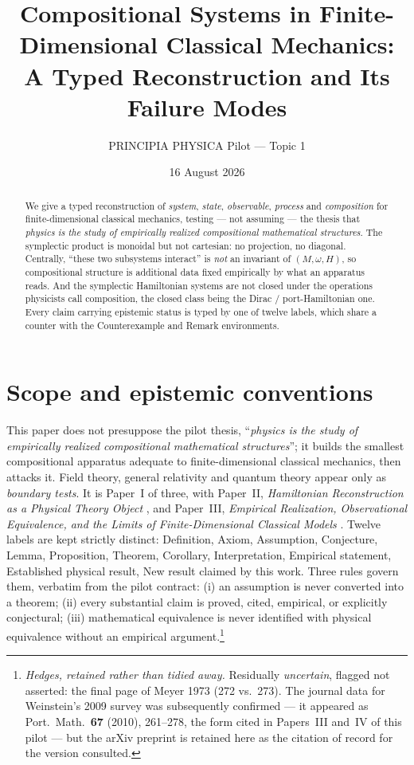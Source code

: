 \documentclass[12pt,a4paper]{article}
\title{\bf Compositional Systems in Finite-Dimensional Classical Mechanics:\\
A Typed Reconstruction and Its Failure Modes}
\author{PRINCIPIA PHYSICA Pilot --- Topic 1}
\date{16 August 2026}
\theoremstyle{definition}
\theoremstyle{plain}
\theoremstyle{commentary}
\begin{document}
\maketitle
\begin{abstract}
\noindent
We give a typed reconstruction of \emph{system}, \emph{state}, \emph{observable},
\emph{process} and \emph{composition} for finite-dimensional classical mechanics, testing ---
not assuming --- the thesis that \emph{physics is the study of empirically realized
compositional mathematical structures}. The symplectic product is monoidal but not cartesian:
no projection, no diagonal. Centrally, ``these two subsystems interact'' is \emph{not} an
invariant of $(M,\omega,H)$, so compositional structure is additional data fixed empirically
by what an apparatus reads. And the symplectic Hamiltonian systems are not closed under the
operations physicists call composition, the closed class being the Dirac / port-Hamiltonian
one. Every claim carrying epistemic status is typed by one of twelve labels, which share a
counter with the Counterexample and Remark environments.
\end{abstract}

\section{Scope and epistemic conventions}

This paper does not presuppose the pilot thesis, ``\emph{physics is the study of empirically
realized compositional mathematical structures}''; it builds the smallest compositional
apparatus adequate to finite-dimensional classical mechanics, then attacks it. Field theory,
general relativity and quantum theory appear only as \emph{boundary tests}. It is
Paper~I of three, with Paper~II, \emph{Hamiltonian Reconstruction as a Physical Theory
Object} \cite{PrincipiaII}, and Paper~III, \emph{Empirical Realization, Observational
Equivalence, and the Limits of Finite-Dimensional Classical Models} \cite{PrincipiaIII}.
Twelve labels are kept strictly distinct: Definition, Axiom, Assumption, Conjecture, Lemma,
Proposition, Theorem, Corollary, Interpretation, Empirical statement, Established physical
result, New result claimed by this work. Three rules govern them, verbatim from the pilot
contract: (i) an assumption is never converted into a theorem; (ii) every substantial claim is
proved, cited, empirical, or explicitly conjectural; (iii) mathematical equivalence is never
identified with physical equivalence without an empirical argument.\footnote{\emph{Hedges,
retained rather than tidied away.} Residually \emph{uncertain}, flagged not asserted: the
final page of Meyer 1973 (272 vs.\ 273). The journal data for Weinstein's 2009 survey was
subsequently confirmed --- it appeared as Port.\ Math.\ \textbf{67} (2010), 261--278, the form
cited in Papers~III and~IV of this pilot --- but the arXiv preprint is retained here as the
citation of record for the version consulted.}
\end{document}
